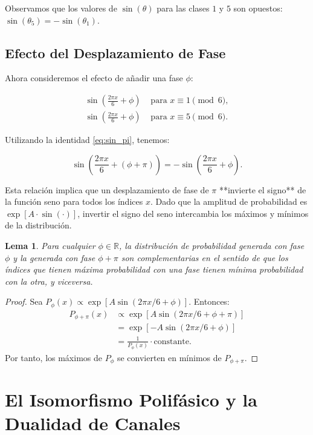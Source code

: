 \documentclass[12pt,a4paper]{article}
\theoremstyle{plain}
\newtheorem{lema}[teorema]{Lema}
\theoremstyle{definition}
\theoremstyle{remark}
\begin{document}
Observamos que los valores de $\sin(\theta)$ para las clases $1$ y $5$ son opuestos: $\sin(\theta_5) = -\sin(\theta_1)$.

\subsection{Efecto del Desplazamiento de Fase}

Ahora consideremos el efecto de añadir una fase $\phi$:

\begin{align}
\sin\left(\frac{2\pi x}{6} + \phi\right) &\text{ para } x \equiv 1 \pmod 6, \\
\sin\left(\frac{2\pi x}{6} + \phi\right) &\text{ para } x \equiv 5 \pmod 6.
\end{align}

Utilizando la identidad \eqref{eq:sin_pi}, tenemos:

\begin{equation}
\sin\left(\frac{2\pi x}{6} + (\phi + \pi)\right) = -\sin\left(\frac{2\pi x}{6} + \phi\right).
\end{equation}

Esta relación implica que un desplazamiento de fase de $\pi$ **invierte el signo** de la función seno para todos los índices $x$. Dado que la amplitud de probabilidad es $\exp[A \cdot \sin(\cdot)]$, invertir el signo del seno intercambia los máximos y mínimos de la distribución.

\begin{lema}
Para cualquier $\phi \in \mathbb{R}$, la distribución de probabilidad generada con fase $\phi$ y la generada con fase $\phi+\pi$ son complementarias en el sentido de que los índices que tienen máxima probabilidad con una fase tienen mínima probabilidad con la otra, y viceversa.
\end{lema}

\begin{proof}
Sea $P_{\phi}(x) \propto \exp[A\sin(2\pi x/6 + \phi)]$. Entonces:
\begin{align}
P_{\phi+\pi}(x) &\propto \exp[A\sin(2\pi x/6 + \phi + \pi)] \\
&= \exp[-A\sin(2\pi x/6 + \phi)] \\
&= \frac{1}{P_{\phi}(x)} \cdot \text{constante}.
\end{align}
Por tanto, los máximos de $P_{\phi}$ se convierten en mínimos de $P_{\phi+\pi}$.
\end{proof}

\section{El Isomorfismo Polifásico y la Dualidad de Canales}
\end{document}
